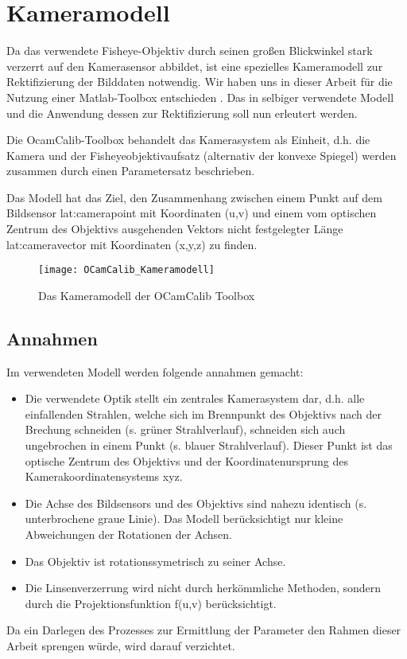\section{Kameramodell}
Da das verwendete Fisheye-Objektiv durch seinen großen Blickwinkel stark verzerrt auf den Kamerasensor abbildet, ist eine spezielles Kameramodell zur Rektifizierung der Bilddaten notwendig. Wir haben uns in dieser Arbeit für die Nutzung einer Matlab-Toolbox entschieden  \autocite{OCamCalibOmnidirectionalCamera, scaramuzzaFlexibleTechniqueAccurate2006, scaramuzzaToolboxEasilyCalibrating2006, scaramuzzaOmnidirectionalVisionCalibration2007, rufliAutomaticDetectionCheckerboards2008}. Das in selbiger verwendete Modell und die Anwendung dessen zur Rektifizierung soll nun erleutert werden. 

Die OcamCalib-Toolbox behandelt das Kamerasystem als Einheit, d.h. die Kamera und der Fisheyeobjektivaufsatz (alternativ der konvexe Spiegel) werden zusammen durch einen Parametersatz beschrieben.

Das Modell hat das Ziel, den Zusammenhang zwischen einem Punkt auf dem Bildsensor \gls{lat:camerapoint} mit Koordinaten (u,v) und einem vom optischen Zentrum des Objektivs ausgehenden Vektors nicht festgelegter Länge \gls{lat:cameravector} mit Koordinaten (x,y,z) zu finden.\\

\begin{figure}[H]
  \centering
  \texttt{[image: OCamCalib\_Kameramodell]}
  \caption{Das Kameramodell der OCamCalib Toolbox}
  \label{fig:kameramodell}
\end{figure}


\subsection{Annahmen}
Im verwendeten Modell werden folgende annahmen gemacht:\\
\begin{itemize}
\item Die verwendete Optik stellt ein zentrales Kamerasystem dar, d.h. alle einfallenden Strahlen, welche sich im Brennpunkt des Objektivs nach der Brechung schneiden (s. grüner Strahlverlauf), schneiden sich auch ungebrochen in einem Punkt (s. blauer Strahlverlauf). Dieser Punkt ist das optische Zentrum des Objektivs und der Koordinatenursprung des Kamerakoordinatensystems xyz.
\item Die Achse des Bildsensors und des Objektivs sind nahezu identisch (s. unterbrochene graue Linie). Das Modell berücksichtigt nur kleine Abweichungen der Rotationen der Achsen.
\item Das Objektiv ist rotationssymetrisch zu seiner Achse.
\item Die Linsenverzerrung wird nicht durch herkömmliche Methoden, sondern durch die Projektionsfunktion f(u,v) berücksichtigt.
\end{itemize}

Da ein Darlegen des Prozesses zur Ermittlung der Parameter den Rahmen dieser Arbeit sprengen würde, wird darauf verzichtet.